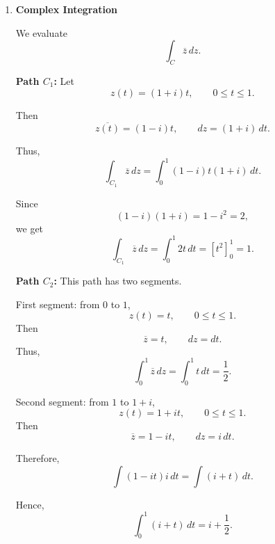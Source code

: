 \begin{enumerate}
    Therefore,
    \[
        a=2.
    \]

    With $a=2$,
    \[
        v(x,y)=3x^2y-y^3+2y.
    \]

    Now observe that
    \[
        z^3=(x+iy)^3
        =
        x^3+3x^2iy+3x(iy)^2+(iy)^3.
    \]

    Since $i^2=-1$ and $i^3=-i$,
    \[
        z^3=x^3+3ix^2y-3xy^2-iy^3.
    \]

    Hence,
    \[
        z^3=(x^3-3xy^2)+i(3x^2y-y^3).
    \]

    Also,
    \[
        2z=2x+i2y.
    \]

    Therefore,
    \[
        z^3+2z
        =
        (x^3-3xy^2+2x)
        +
        i(3x^2y-y^3+2y).
    \]

    Thus,
    \[
        f(z)=z^3+2z.
    \]

    \item \textbf{Complex Integration}

    We evaluate
    \[
        \int_C \overline{z}\,dz.
    \]

    \textbf{Path $C_1$:} Let
    \[
        z(t)=(1+i)t,
        \qquad 0\le t\le 1.
    \]

    Then
    \[
        \overline{z(t)}=(1-i)t,
        \qquad
        dz=(1+i)\,dt.
    \]

    Thus,
    \[
        \int_{C_1}\overline{z}\,dz
        =
        \int_0^1 (1-i)t(1+i)\,dt.
    \]

    Since
    \[
        (1-i)(1+i)=1-i^2=2,
    \]
    we get
    \[
        \int_{C_1}\overline{z}\,dz
        =
        \int_0^1 2t\,dt
        =
        \left[t^2\right]_0^1
        =
        1.
    \]

    \textbf{Path $C_2$:} This path has two segments.

    First segment: from $0$ to $1$,
    \[
        z(t)=t,
        \qquad 0\le t\le 1.
    \]
    Then
    \[
        \overline{z}=t,
        \qquad
        dz=dt.
    \]
    Thus,
    \[
        \int_{0}^{1} \overline{z}\,dz
        =
        \int_0^1 t\,dt
        =
        \frac12.
    \]

    Second segment: from $1$ to $1+i$,
    \[
        z(t)=1+it,
        \qquad 0\le t\le 1.
    \]
    Then
    \[
        \overline{z}=1-it,
        \qquad
        dz=i\,dt.
    \]

    Therefore,
    \[
        \int (1-it)i\,dt
        =
        \int (i+t)\,dt.
    \]

    Hence,
    \[
        \int_0^1 (i+t)\,dt
        =
        i+\frac12.
    \]


\end{enumerate}
